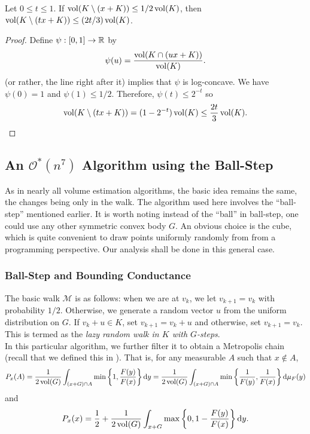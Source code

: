 \begin{lemma}
	\label{lemma 4.39}
	Let $0\leq t\leq 1$. If $\operatorname{vol}(K\setminus (x+K)) \leq 1/2 \operatorname{vol}(K)$, then $\operatorname{vol}(K\setminus (tx+K)) \leq (2t/3) \operatorname{vol}(K)$.
\end{lemma}
\begin{proof}
	Define $\psi:[0,1]\to\mathbb{R}$ by
	\[ \psi(u) = \frac{\operatorname{vol}(K\cap (ux+K))}{\operatorname{vol}(K)}. \]
	 (or rather, the line right after it) implies that $\psi$ is log-concave. We have $\psi(0)=1$ and $\psi(1)\leq 1/2$. Therefore, $\psi(t) \leq 2^{-t}$ so
	\[ \operatorname{vol}(K\setminus (tx+K)) = (1 - 2^{-t})\operatorname{vol}(K) \leq \frac{2t}{3}\operatorname{vol}(K).\qedhere \]
\end{proof}


\subsection{An \texorpdfstring{$\mathcal{O}^*(n^7)$}{O(n7)} Algorithm using the Ball-Step}

As in nearly all volume estimation algorithms, the basic idea remains the same, the changes being only in the walk. The algorithm used here involves the ``ball-step'' mentioned earlier. It is worth noting instead of the ``ball'' in ball-step, one could use any other symmetric convex body $G$. An obvious choice is the cube, which is quite convenient to draw points uniformly randomly from from a programming perspective. Our analysis shall be done in this general case.

\subsubsection{Ball-Step and Bounding Conductance}

The basic walk $\mathcal{M}$ is as follows: when we are at $v_k$, we let $v_{k+1}=v_k$ with probability $1/2$. Otherwise, we generate a random vector $u$ from the uniform distribution on $G$. If $v_k+u\in K$, set $v_{k+1}=v_k+u$ and otherwise, set $v_{k+1}=v_k$. This is termed as the \textit{lazy random walk in $K$ with $G$-steps}.\\
In this particular algorithm, we further filter it to obtain a Metropolis chain (recall that we defined this in ). That is, for any measurable $A$ such that $x\not\in A$,
\[ P_x(A) = \frac{1}{2\operatorname{vol}(G)} \int_{(x+G)\cap A} \min\left\{1,\frac{F(y)}{F(x)}\right\}\operatorname{d}\!{y} = \frac{1}{2\operatorname{vol}(G)} \int_{(x+G)\cap A} \min\left\{\frac{1}{F(y)},\frac{1}{F(x)}\right\}\operatorname{d}\!{\mu}_F(y) \]
and
\[ P_x(x) = \frac{1}{2} + \frac{1}{2\operatorname{vol}(G)} \int_{x+G} \max\left\{0,1-\frac{F(y)}{F(x)}\right\}\operatorname{d}\!{y}. \]

